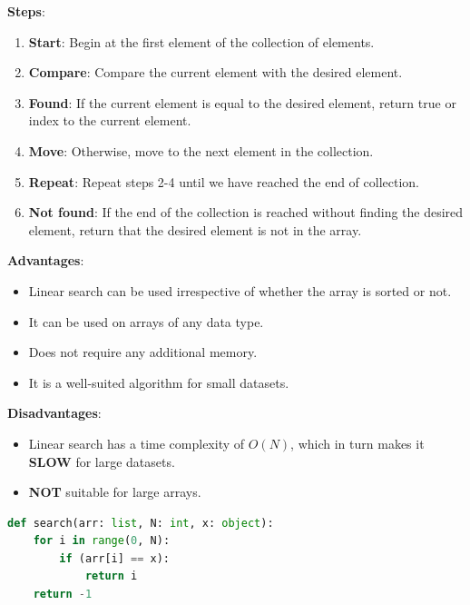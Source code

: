 \textbf{Steps}:
\begin{enumerate}
    \item \textbf{Start}: Begin at the first element of the collection of elements.
    \item \textbf{Compare}: Compare the current element with the desired element.
    \item \textbf{Found}: If the current element is equal to the desired element, return true or index to the current element.
    \item \textbf{Move}: Otherwise, move to the next element in the collection.
    \item \textbf{Repeat}: Repeat steps 2-4 until we have reached the end of collection.
    \item \textbf{Not found}: If the end of the collection is reached without finding the desired element, return that the desired element is not in the array.
\end{enumerate}

\begin{table}[h]
    \begin{minipage}[t]{0.48\linewidth}
        \textbf{Advantages}:
        \begin{itemize}
            \item Linear search can be used irrespective of whether the array is sorted or not. 
            \item It can be used on arrays of any data type.
            \item Does not require any additional memory.
            \item It is a well-suited algorithm for small datasets.
        \end{itemize}
    \end{minipage}
    \hfill
    \begin{minipage}[t]{0.48\linewidth}
        \textbf{Disadvantages}:
        \begin{itemize}
            \item Linear search has a time complexity of $O(N)$, which in turn makes it \textbf{SLOW} for large datasets.
            \item \textbf{NOT} suitable for large arrays.
        \end{itemize}
    \end{minipage}
\end{table}

\begin{lstlisting}[language=Python, caption=Linear Search Algorithm - Python]
def search(arr: list, N: int, x: object):
    for i in range(0, N):
        if (arr[i] == x):
            return i
    return -1
\end{lstlisting}

